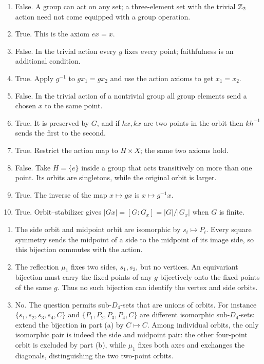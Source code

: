 \begin{enumerate}[label=(\alph*)]
\item False. A group can act on any set; a three-element set with the trivial
$\mathbb{Z}_2$ action need not come equipped with a group operation.
\item True. This is the axiom $ex=x$.
\item False. In the trivial action every $g$ fixes every point; faithfulness
is an additional condition.
\item True. Apply $g^{-1}$ to $gx_1=gx_2$ and use the action axioms to get
$x_1=x_2$.
\item False. In the trivial action of a nontrivial group all group elements
send a chosen $x$ to the same point.
\item True. It is preserved by $G$, and if $hx,kx$ are two points in the
orbit then $kh^{-1}$ sends the first to the second.
\item True. Restrict the action map to $H\times X$; the same two axioms hold.
\item False. Take $H=\{e\}$ inside a group that acts transitively on more than
one point. Its orbits are singletons, while the original orbit is larger.
\item True. The inverse of the map $x\mapsto gx$ is $x\mapsto g^{-1}x$.
\item True. Orbit--stabilizer gives $|Gx|=[G:G_x]=|G|/|G_x|$ when $G$ is finite.
\end{enumerate}

\begin{enumerate}[label=(\alph*)]
\item The side orbit and midpoint orbit are isomorphic by $s_i\mapsto P_i$.
Every square symmetry sends the midpoint of a side to the midpoint of its
image side, so this bijection commutes with the action.
\item The reflection $\mu_1$ fixes two sides, $s_1,s_3$, but no vertices.
An equivariant bijection must carry the fixed points of any $g$ bijectively
onto the fixed points of the same $g$. Thus no such bijection can identify
the vertex and side orbits.
\item No. The question permits sub-$D_4$-sets that are unions of orbits.
For instance $\{s_1,s_2,s_3,s_4,C\}$ and
$\{P_1,P_2,P_3,P_4,C\}$ are different isomorphic sub-$D_4$-sets: extend the
bijection in part (a) by $C\mapsto C$. Among individual orbits, the only
isomorphic pair is indeed the side and midpoint pair: the other four-point
orbit is excluded by part (b), while $\mu_1$ fixes both axes and exchanges
the diagonals, distinguishing the two two-point orbits.
\end{enumerate}

